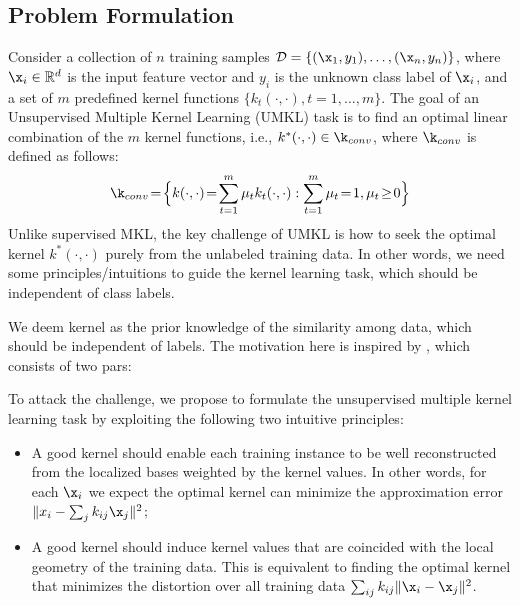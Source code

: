 \subsection{Problem Formulation}

Consider a collection of $n$ training samples $\mathcal D = \{(\x_1, y_1),\ldots,(\x_n, y_n)\}$, where $\x_i\in\mathbb{R}^d$ is the input feature vector
and $y_i$ is the unknown class label of $\x_i$, and a set of $m$ predefined kernel functions $\{k_t(\cdot,\cdot),t=1,\ldots,m\}$. The goal of an Unsupervised Multiple Kernel Learning (UMKL) task is to find an optimal linear combination of the $m$ kernel functions, i.e., $k^*(\cdot,\cdot)\in\k_{conv}$, where $\k_{conv}$ is defined as follows:
\begin{equation}
\k_{conv} \!=\!\Big\{k(\cdot,\cdot) \!=\! \sum_{t=1}^m \mu_t k_t(\cdot,\cdot): \sum_{t=1}^m\mu_t  \!=\! 1,\mu_t \!\geq\! 0\Big\}\label{eqn:convex-mkl}
\end{equation}
Unlike supervised MKL, the key challenge of UMKL is how to seek the optimal kernel $k^*(\cdot,\cdot)$ purely from the unlabeled training data. In other words, we need some principles/intuitions to guide the kernel learning task, which should be independent of class labels.

 We deem kernel as the prior knowledge of the similarity among data, which should be independent of labels. The motivation here is inspired by \cite{nips/YuZG09}, which consists of two pars:\fi

To attack the challenge, we propose to formulate the unsupervised multiple kernel learning task by exploiting the following two intuitive principles:
\begin{itemize}
\item A good kernel should enable each training instance to be well reconstructed from the localized bases weighted by the kernel values. In other words, for each $\x_i$ we expect the optimal kernel can minimize the approximation error $\|x_i-\sum_jk_{ij}\x_j\|^2$;
\item A good kernel should induce kernel values that are coincided with the local geometry of the training data. This is equivalent to finding the optimal kernel that minimizes the distortion over all training data $\sum_{ij}k_{ij}\|\x_i-\x_j\|^2$.
\end{itemize}

